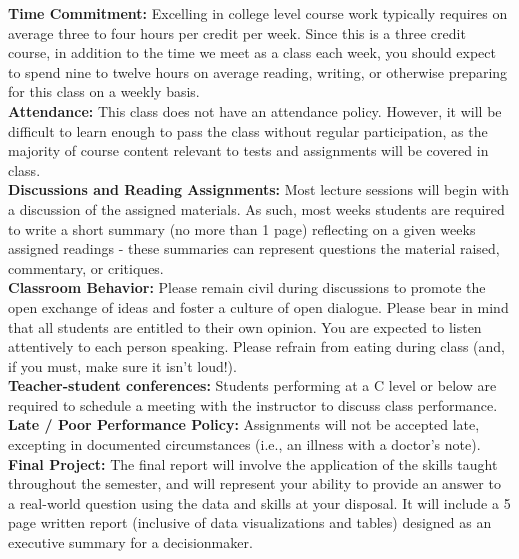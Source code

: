 \documentclass[11pt]{article}
\begin{document}
\textbf {\large Time Commitment:} Excelling in college level course work typically requires on average three to four hours per credit per week.  Since this is a three credit course, in addition to the time we meet as a class each week, you should expect to spend nine to twelve hours on average reading, writing, or otherwise preparing for this class on a weekly basis.\\

\textbf {\large Attendance:} This class does not have an attendance policy.  However, it will be difficult to learn enough to pass the class without regular participation, as the majority of course content relevant to tests and assignments will be covered in class.\\

\textbf {\large Discussions and Reading Assignments:} Most lecture sessions will begin with a discussion of the assigned materials.  As such, most weeks students are required to write a short summary (no more than 1 page) reflecting on a given weeks assigned readings - these summaries can represent questions the material raised, commentary, or critiques. \\

\textbf {\large Classroom Behavior:} Please remain civil during discussions to promote the open exchange of ideas and foster a culture of open dialogue.  Please bear in mind that all students are entitled to their own opinion.  You are expected to listen attentively to each person speaking.  Please refrain from eating during class (and, if you must, make sure it isn't loud!).\\

\textbf {\large Teacher-student conferences:} Students performing at a C level or below are required to schedule a meeting with the instructor to discuss class performance.\\

\textbf {\large Late / Poor Performance Policy:} Assignments will not be accepted late, excepting in documented circumstances (i.e., an illness with a doctor's note). \\

\textbf {\large Final Project:} The final report will involve the application of the skills taught throughout the semester, and will represent your ability to provide an answer to a real-world question using the data and skills at your disposal. It will include a 5 page written report (inclusive of data visualizations and tables) designed as an executive summary for a decisionmaker.\\
\end{document}
